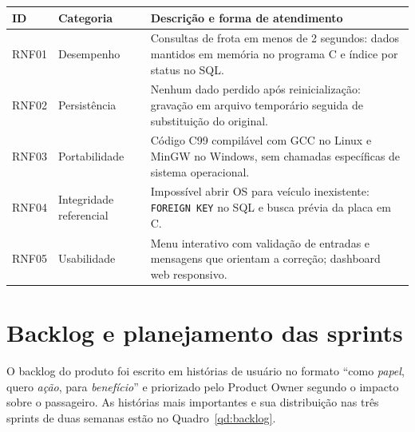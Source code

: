 \documentclass[12pt,a4paper,oneside]{report}
\newcommand{\fonte}[1]{\par\vspace{2pt}{\small Fonte: #1}\par}
\begin{document}
\begin{quadro}[H]
  \caption{Requisitos não funcionais}\label{qd:rnf}
  \small\singlespacing
  \renewcommand{\arraystretch}{1.25}
  \begin{tabularx}{\textwidth}{|>{\centering\arraybackslash}p{1.3cm}|>{\raggedright\arraybackslash}p{3.4cm}|X|}
    \hline
    \rowcolor{gray!15}\textbf{ID} & \textbf{Categoria} & \textbf{Descrição e forma de atendimento} \\ \hline
    RNF01 & Desempenho & Consultas de frota em menos de 2 segundos: dados mantidos em memória no programa C e índice por status no SQL. \\ \hline
    RNF02 & Persistência & Nenhum dado perdido após reinicialização: gravação em arquivo temporário seguida de substituição do original. \\ \hline
    RNF03 & Portabilidade & Código C99 compilável com GCC no Linux e MinGW no Windows, sem chamadas específicas de sistema operacional. \\ \hline
    RNF04 & Integridade referencial & Impossível abrir OS para veículo inexistente: \texttt{FOREIGN KEY} no SQL e busca prévia da placa em C. \\ \hline
    RNF05 & Usabilidade & Menu interativo com validação de entradas e mensagens que orientam a correção; dashboard web responsivo. \\ \hline
  \end{tabularx}
  \fonte{Elaborado pelo autor (2026).}
\end{quadro}

\section{Backlog e planejamento das sprints}

O backlog do produto foi escrito em histórias de usuário no formato ``como \emph{papel}, quero
\emph{ação}, para \emph{benefício}'' e priorizado pelo Product Owner segundo o impacto sobre o
passageiro. As histórias mais importantes e sua distribuição nas três sprints de duas semanas estão no
Quadro~\ref{qd:backlog}.
\end{document}
